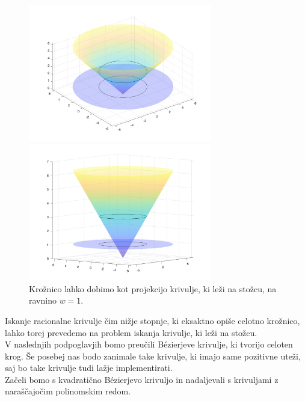 \documentclass[a4paper,11pt]{article}
\theoremstyle{definition}
\theoremstyle{plain}
\begin{document}
\begin{figure}[ht!]
    \begin{minipage}{0.5\textwidth}
        \centering
        \includegraphics[width=80mm]{stozec.png}
    \end{minipage}\hfill
    \begin{minipage}{0.5\textwidth}
        \centering
        \includegraphics[width=80mm]{stozec_1.png}
    \end{minipage}\hfill
    \caption{Krožnico lahko dobimo kot projekcijo krivulje, ki leži na stožcu, na ravnino $w = 1$.}
\end{figure}
\noindent
Iskanje racionalne krivulje čim nižje stopnje, ki eksaktno opiše celotno krožnico, lahko torej prevedemo na problem iskanja krivulje, ki leži na stožcu. 
\\
V naslednjih podpoglavjih bomo preučili B\'ezierjeve krivulje, ki tvorijo celoten krog. 
Še posebej nas bodo zanimale take krivulje, ki imajo same pozitivne uteži, saj bo take krivulje tudi lažje implementirati.
\\
Začeli bomo s kvadratično B\'ezierjevo krivuljo in nadaljevali s krivuljami z naraščajočim polinomskim redom.

\end{document}
